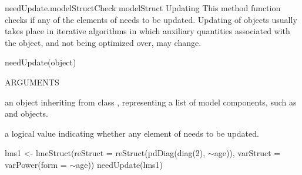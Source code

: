 \documentclass[pdftex]{article} \usepackage{url,graphicx}
\renewcommand{\Twiddle}{\mbox{\(\sim\)}}
\begin{document}
\begin{Helpfile}{needUpdate.modelStruct}{Check modelStruct Updating}
This method function checks if any of the elements of 
needs to be updated. Updating of objects usually takes place in
iterative algorithms in which auxiliary quantities associated with the
object, and not being optimized over, may change.
\begin{Example}
needUpdate(object)
\end{Example}
\begin{Argument}{ARGUMENTS}
\item[\Co{object:}]
an object inheriting from class ,
representing a list of model components, such as  and
 objects.
\end{Argument}
a logical value indicating whether any element of  needs
to be updated.
\need 15pt
\vspace{-16pt} 
\begin{Example}
lms1 <- lmeStruct(reStruct = reStruct(pdDiag(diag(2), \Twiddle age)),
   varStruct = varPower(form = \Twiddle age))
needUpdate(lms1)
\end{Example}
\end{Helpfile}
\end{document}
